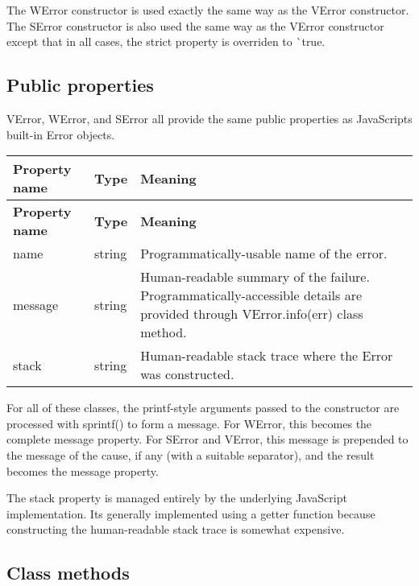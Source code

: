 The {\ttfamily W\+Error} constructor is used exactly the same way as the {\ttfamily V\+Error} constructor. The {\ttfamily S\+Error} constructor is also used the same way as the {\ttfamily V\+Error} constructor except that in all cases, the {\ttfamily strict} property is overriden to \`{}true.

\subsection*{Public properties}

{\ttfamily V\+Error}, {\ttfamily W\+Error}, and {\ttfamily S\+Error} all provide the same public properties as Java\+Script\textquotesingle{}s built-\/in Error objects.

\tabulinesep=1mm
\begin{longtabu} spread 0pt [c]{*{3}{|X[-1]}|}
\hline
\rowcolor{\tableheadbgcolor}\textbf{ Property name  }&\textbf{ Type  }&\textbf{ Meaning   }\\
\endfirsthead
\hline
\endfoot
\hline
\rowcolor{\tableheadbgcolor}\textbf{ Property name  }&\textbf{ Type  }&\textbf{ Meaning   }\\
\endhead
{\ttfamily name}  &string  &Programmatically-\/usable name of the error.   \\
{\ttfamily message}  &string  &Human-\/readable summary of the failure. Programmatically-\/accessible details are provided through {\ttfamily V\+Error.\+info(err)} class method.   \\
{\ttfamily stack}  &string  &Human-\/readable stack trace where the Error was constructed.   \\
\end{longtabu}


For all of these classes, the printf-\/style arguments passed to the constructor are processed with {\ttfamily sprintf()} to form a message. For {\ttfamily W\+Error}, this becomes the complete {\ttfamily message} property. For {\ttfamily S\+Error} and {\ttfamily V\+Error}, this message is prepended to the message of the cause, if any (with a suitable separator), and the result becomes the {\ttfamily message} property.

The {\ttfamily stack} property is managed entirely by the underlying Java\+Script implementation. It\textquotesingle{}s generally implemented using a getter function because constructing the human-\/readable stack trace is somewhat expensive.

\subsection*{Class methods}

